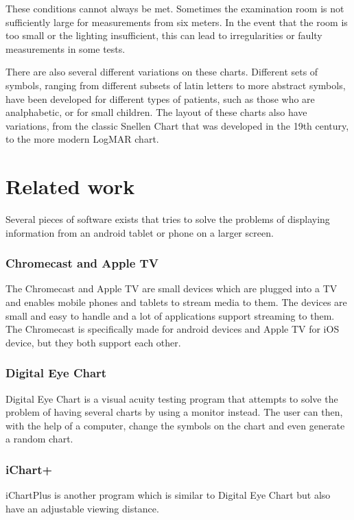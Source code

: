 \documentclass[12pt,a4paper,notitlepage]{report}
\begin{document}
These conditions cannot always be met. Sometimes the examination room is not sufficiently large for measurements from six meters. In the event that the room is too small or the lighting insufficient, this can lead to irregularities or faulty measurements in some tests. %

There are also several different variations on these charts. Different sets of symbols, ranging from different subsets of latin letters to more abstract symbols, have been developed for different types of patients, such as those who are analphabetic, or for small children. The layout of these charts also have variations, from the classic Snellen Chart that was developed in the 19th century, to the more modern LogMAR chart.

\section{Related work}
Several pieces of software exists that tries to solve the problems of displaying information from an android tablet or phone on a larger screen. 

\subsubsection{Chromecast and Apple TV}
The Chromecast \cite{chromecast} and Apple TV \cite{appletv} are small devices which are plugged into a TV and enables mobile phones and tablets to stream media to them. The devices are small and easy to handle and a lot of applications support streaming to them. The Chromecast is specifically made for android devices and Apple TV for iOS device, but they both support each other.

\subsubsection{Digital Eye Chart}
 Digital Eye Chart \cite{digitaleyechart} is a visual acuity testing program that attempts to solve the problem of having several charts by using a monitor instead. The user can then, with the help of a computer, change the symbols on the chart and even generate a random chart. 

\subsubsection{iChart+}
iChartPlus \cite{ichartplus} is another program which is similar to Digital Eye Chart but also have an adjustable viewing distance. 
\end{document}
